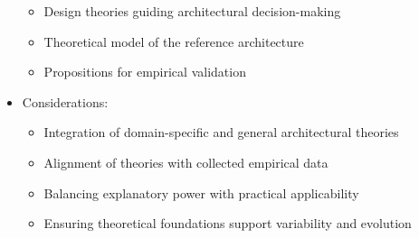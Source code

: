 \documentclass[12pt,a4paper]{article}
\begin{document}
\begin{itemize}
\begin{itemize}
        \item Design theories guiding architectural decision-making
        \item Theoretical model of the reference architecture
        \item Propositions for empirical validation
    \end{itemize}
    \item Considerations:
    \begin{itemize}
        \item Integration of domain-specific and general architectural theories
        \item Alignment of theories with collected empirical data
        \item Balancing explanatory power with practical applicability
        \item Ensuring theoretical foundations support variability and evolution
    \end{itemize}
\end{itemize}
\end{document}

